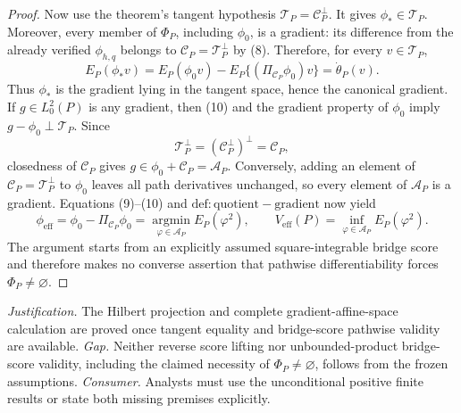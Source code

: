 \documentclass{article}
\begin{document}
\begin{proof}
Now use the theorem's tangent hypothesis \(\mathcal T_P=\mathcal C_P^\perp\).  It gives \(\phi_*\in\mathcal T_P\).  Moreover, every member of \(\Phi_P\), including \(\phi_0\), is a gradient: its difference from the already verified \(\phi_{h,q}\) belongs to \(\mathcal C_P=\mathcal T_P^\perp\) by (8).  Therefore, for every \(v\in\mathcal T_P\),
\[
 E_P(\phi_*v)
 =E_P(\phi_0v)-E_P\{(\Pi_{\mathcal C_P}\phi_0)v\}
 =\dot\theta_P(v).                                                  \tag{10}
\]
Thus \(\phi_*\) is the gradient lying in the tangent space, hence the canonical gradient.  If \(g\in L_0^2(P)\) is any gradient, then (10) and the gradient property of \(\phi_0\) imply \(g-\phi_0\perp\mathcal T_P\).  Since
\[
 \mathcal T_P^\perp=(\mathcal C_P^\perp)^\perp=\mathcal C_P,
\]
closedness of \(\mathcal C_P\) gives \(g\in\phi_0+\mathcal C_P=\mathcal A_P\).  Conversely, adding an element of \(\mathcal C_P=\mathcal T_P^\perp\) to \(\phi_0\) leaves all path derivatives unchanged, so every element of \(\mathcal A_P\) is a gradient.  Equations (9)--(10) and \(\mathrm{def:quotient-gradient}\) now yield
\[
 \phi_{\mathrm{eff}}
 =\phi_0-\Pi_{\mathcal C_P}\phi_0
 =\operatorname*{argmin}_{\varphi\in\mathcal A_P}E_P(\varphi^2),
 \qquad
 V_{\mathrm{eff}}(P)=\inf_{\varphi\in\mathcal A_P}E_P(\varphi^2).
\]
The argument starts from an explicitly assumed square-integrable bridge score and therefore makes no converse assertion that pathwise differentiability forces \(\Phi_P\neq\varnothing\).
\end{proof}
\par\smallskip\noindent \textit{Justification.} The Hilbert projection and complete gradient-affine-space calculation are proved once tangent equality and bridge-score pathwise validity are available. \textit{Gap.} Neither reverse score lifting nor unbounded-product bridge-score validity, including the claimed necessity of \(\Phi_P\ne\varnothing\), follows from the frozen assumptions. \textit{Consumer.} Analysts must use the unconditional positive finite results or state both missing premises explicitly.
\end{document}

